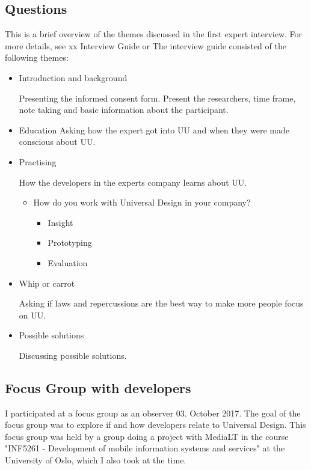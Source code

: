 \subsection{Questions}
This is a brief overview of the themes discussed in the first expert interview. For more details, see xx Interview Guide or %
The interview guide consisted of the following themes:
\begin{itemize}
    \item Introduction and background
    
    Presenting the informed consent form. Present the researchers, time frame, note taking and basic information about the participant.
    
    \item Education
    Asking how the expert got into UU and when they were made conscious about UU.
    
    \item Practising
    
    How the developers in the experts company learns about UU.
    \begin{itemize}
        \item How do you work with Universal Design in your company?
        \begin{itemize}
            \item Insight
            \item Prototyping
            \item Evaluation
        \end{itemize}
    \end{itemize}
    \item Whip or carrot
    
    Asking if laws and repercussions are the best way to make more people focus on UU.
    
    \item Possible solutions
    
    Discussing possible solutions.
\end{itemize}

\subsection{Focus Group with developers}
I participated at a focus group as an observer 03. October 2017. The goal of the focus group was to explore if and how developers relate to Universal Design. This focus group was held by a group doing a project with MediaLT in the course "INF5261 - Development of mobile information systems and services" at the University of Oslo, which I also took at the time.

